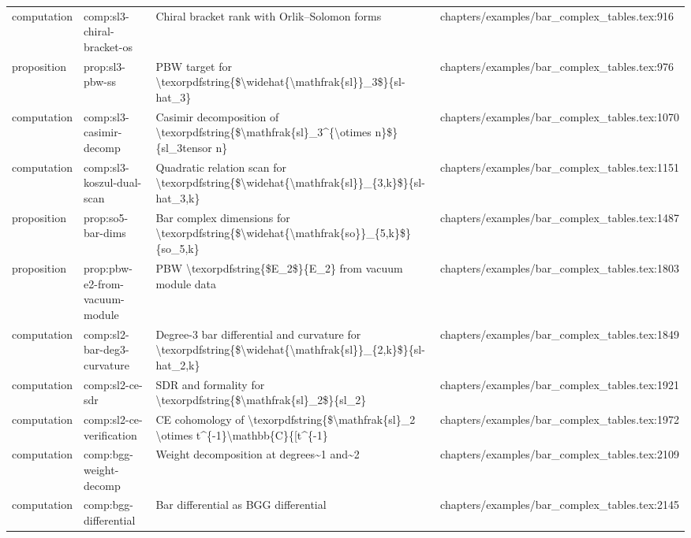 \documentclass[11pt]{article}
\begin{document}
\begin{longtable}{L{0.10\textwidth}L{0.26\textwidth}L{0.42\textwidth}L{0.22\textwidth}}
computation & comp:sl3-chiral-bracket-os & Chiral bracket rank with Orlik--Solomon forms & chapters/examples/bar\_complex\_tables.tex:916\\
proposition & prop:sl3-pbw-ss & PBW target for \textbackslash{}texorpdfstring\{\$\textbackslash{}widehat\{\textbackslash{}mathfrak\{sl\}\}\_3\$\}\{sl-hat\_3\} & chapters/examples/bar\_complex\_tables.tex:976\\
computation & comp:sl3-casimir-decomp & Casimir decomposition of \textbackslash{}texorpdfstring\{\$\textbackslash{}mathfrak\{sl\}\_3\textasciicircum{}\{\textbackslash{}otimes n\}\$\}\{sl\_3tensor n\} & chapters/examples/bar\_complex\_tables.tex:1070\\
computation & comp:sl3-koszul-dual-scan & Quadratic relation scan for \textbackslash{}texorpdfstring\{\$\textbackslash{}widehat\{\textbackslash{}mathfrak\{sl\}\}\_\{3,k\}\$\}\{sl-hat\_3,k\} & chapters/examples/bar\_complex\_tables.tex:1151\\
proposition & prop:so5-bar-dims & Bar complex dimensions for \textbackslash{}texorpdfstring\{\$\textbackslash{}widehat\{\textbackslash{}mathfrak\{so\}\}\_\{5,k\}\$\}\{so\_5,k\} & chapters/examples/bar\_complex\_tables.tex:1487\\
proposition & prop:pbw-e2-from-vacuum-module & PBW \textbackslash{}texorpdfstring\{\$E\_2\$\}\{E\_2\} from vacuum module data & chapters/examples/bar\_complex\_tables.tex:1803\\
computation & comp:sl2-bar-deg3-curvature & Degree-3 bar differential and curvature for \textbackslash{}texorpdfstring\{\$\textbackslash{}widehat\{\textbackslash{}mathfrak\{sl\}\}\_\{2,k\}\$\}\{sl-hat\_2,k\} & chapters/examples/bar\_complex\_tables.tex:1849\\
computation & comp:sl2-ce-sdr & SDR and formality for \textbackslash{}texorpdfstring\{\$\textbackslash{}mathfrak\{sl\}\_2\$\}\{sl\_2\} & chapters/examples/bar\_complex\_tables.tex:1921\\
computation & comp:sl2-ce-verification & CE cohomology of \textbackslash{}texorpdfstring\{\$\textbackslash{}mathfrak\{sl\}\_2 \textbackslash{}otimes t\textasciicircum{}\{-1\}\textbackslash{}mathbb\{C\}\{[t\textasciicircum{}\{-1\} & chapters/examples/bar\_complex\_tables.tex:1972\\
computation & comp:bgg-weight-decomp & Weight decomposition at degrees\textasciitilde{}1 and\textasciitilde{}2 & chapters/examples/bar\_complex\_tables.tex:2109\\
computation & comp:bgg-differential & Bar differential as BGG differential & chapters/examples/bar\_complex\_tables.tex:2145\\

\end{longtable}
\end{document}
